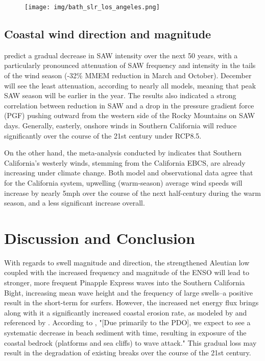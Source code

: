 \documentclass[12pt, letterpaper]{article}
\begin{document}
	\begin{figure}[h]
		\centering
		\texttt{[image: img/bath\_slr\_los\_angeles.png]}
		\caption{\citep{bath-cosmos}}
		\label{fig:slr_los_angeles}
	\end{figure}

	\subsection {Coastal wind direction and magnitude}
	\citeauthor{winds-santa-ana} predict a gradual decrease in SAW intensity over the next 50 years, with a particularly pronounced attenuation of SAW frequency and intensity in the tails of the wind season (-32\% MMEM reduction in March and October). December will see the least attenuation, according to nearly all models, meaning that peak SAW season will be earlier in the year. The results also indicated a strong correlation between reduction in SAW and a drop in the pressure gradient force (PGF) pushing outward from the western side of the Rocky Mountains on SAW days. Generally, easterly, onshore winds in Southern California will reduce significantly over the course of the 21st century under RCP8.5. \citep{winds-santa-ana}

	On the other hand, the meta-analysis conducted by \citeauthor{winds-coastal} indicates that Southern California's westerly winds, stemming from the California EBCS, are already increasing under climate change. Both model and observational data agree that for the California system, upwelling (warm-season) average wind speeds will increase by nearly 5mph over the course of the next half-century during the warm season, and a less significant increase overall. \citep{winds-coastal}

	\section {Discussion and Conclusion}
	With regards to swell magnitude and direction, the strengthened Aleutian low coupled with the increased frequency and magnitude of the ENSO \citep{bath-el-nino} will lead to stronger, more frequent Pinapple Express waves into the Southern California Bight, increasing mean wave height and the frequency of large swells--a positive result in the short-term for surfers. However, the increased net energy flux brings along with it a significantly increased coastal erosion rate, as modeled by \citeauthor{bath-cosmos} and referenced by \citeauthor{swells-deep-water-waves}. According to \citeauthor{swells-deep-water-waves}, "[Due primarily to the PDO], we expect to see a systematic decrease in beach sediment with time, resulting in exposure of the coastal bedrock (platforms and sea cliffs) to wave attack." This gradual loss may result in the degradation of existing breaks over the course of the 21st century. 
\end{document}
